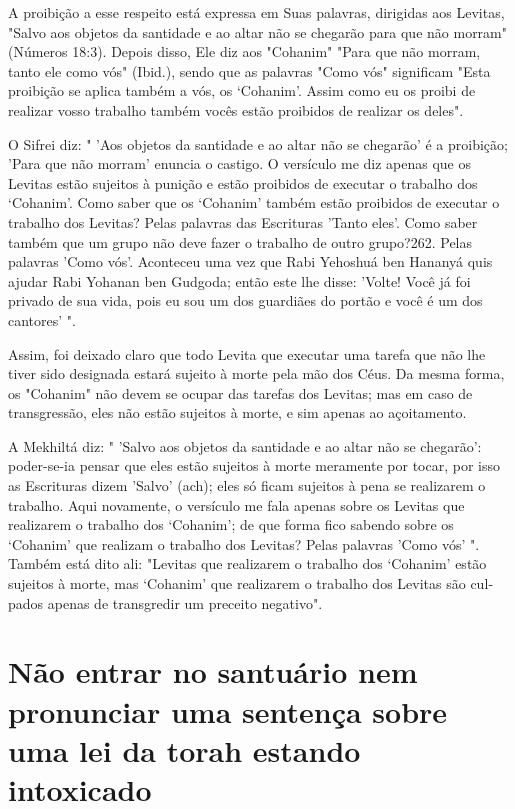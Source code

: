 \begin{itemize}
\begin{enumrate}
\begin{itemize}
\begin{itemize}
\begin{itemize}
A proibição a esse respeito está expressa em Suas palavras, dirigidas
aos Levitas, "Salvo aos objetos da santidade e ao altar não se chegarão
para que não morram" (Números 18:3). Depois disso, Ele diz aos "Cohanim"
"Para que não morram, tanto ele como vós" (Ibid.), sendo que as palavras
"Como vós" significam "Esta proibição se aplica também a vós, os
`Cohanim'. Assim como eu os proibi de realizar vosso trabalho também
vocês estão proibidos de reali­zar os deles".

O Sifrei diz: " 'Aos objetos da santidade e ao altar não se chegarão' é
a proibição; 'Para que não morram' enuncia o castigo. O versículo me diz
apenas que os Levitas estão sujeitos à punição e estão proibidos de
executar o trabalho dos `Cohanim'. Como saber que os `Cohanim' também
estão proibi­dos de executar o trabalho dos Levitas? Pelas palavras das
Escrituras 'Tanto eles'. Como saber também que um grupo não deve fazer o
trabalho de outro gru­po?262. Pelas palavras 'Como vós'. Aconteceu uma
vez que Rabi Yehoshuá ben Hananyá quis ajudar Rabi Yohanan ben Gudgoda;
então este lhe disse: 'Volte! Você já foi privado de sua vida, pois eu
sou um dos guardiães do portão e você é um dos cantores' ".

Assim, foi deixado claro que todo Levita que executar uma tarefa que não
lhe tiver sido designada estará sujeito à morte pela mão dos Céus. Da
mesma forma, os "Cohanim" não devem se ocupar das tarefas dos Levitas;
mas em caso de transgressão, eles não estão sujeitos à morte, e sim
apenas ao açoitamento.

A Mekhiltá diz: " 'Salvo aos objetos da santidade e ao altar não se
che­garão': poder-se-ia pensar que eles estão sujeitos à morte meramente
por tocar, por isso as Escrituras dizem 'Salvo' (ach); eles só ficam
sujeitos à pena se realiza­rem o trabalho. Aqui novamente, o versículo
me fala apenas sobre os Levitas que realizarem o trabalho dos `Cohanim';
de que forma fico sabendo sobre os
`Cohanim' que realizam o trabalho dos Levitas? Pelas palavras 'Como vós'
". Também está dito ali: "Levitas que realizarem o trabalho dos
`Cohanim' estão sujeitos à morte, mas `Cohanim' que realizarem o
trabalho dos Levitas são cul­pados apenas de transgredir um preceito
negativo".


\section{Não entrar no santuário nem pronunciar uma 
sentença sobre uma lei da torah estando intoxicado}


\end{itemize}
\end{itemize}
\end{itemize}
\end{enumrate}
\end{itemize}
